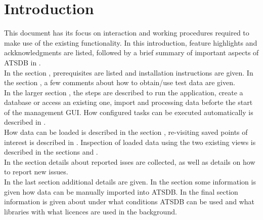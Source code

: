 \chapter{Introduction}

This document has its focus on interaction and working procedures required to make use of the existing
functionality. In this introduction, feature highlights and ackknowledgments are listed, followed by a brief summary of important aspects of  ATSDB in . \\

In the section , prerequisites are listed and installation instructions are given. In the section , a few comments about how to obtain/use test data are given. \\

In the larger section , the steps are described to run the application, create a database or access an existing one, import and processing data beforte the start of the management GUI. How configured tasks can be executed automatically is described in . \\

How data can be loaded is described in the section , re-visiting saved points of interest is described in . Inspection of loaded data using the two existing views is described in the sections  and . \\

In the section  details about reported isses are collected, as well as details on how to report new issues. \\

In the last section  additional details are given. In the section  some information is given how data can be manually imported into ATSDB. In the final section  information is given about under what conditions ATSDB can be used and what libraries with what licences are used in the background.












